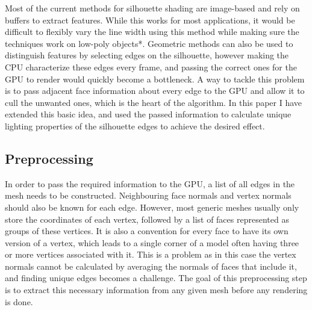 \documentclass[a4paper, 12pt]{article}
\begin{document}
Most of the current methods for silhouette shading are image-based and rely on buffers to extract features. While this works for most applications, it would be difficult to flexibly vary the line width using this method while making sure the techniques work on low-poly objects*. Geometric methods can also be used to distinguish features by selecting edges on the silhouette, however making the CPU characterize these edges every frame, and passing the correct ones for the GPU to render would quickly become a bottleneck. A way to tackle this problem is to pass adjacent face information about every edge to the GPU and allow it to cull the unwanted ones, which is the heart of the algorithm. In this paper I have extended this basic idea, and used the passed information to calculate unique lighting properties of the silhouette edges to achieve the desired effect.



\subsection{Preprocessing}

In order to pass the required information to the GPU, a list of all edges in the mesh needs to be constructed. Neighbouring face normals and vertex normals should also be known for each edge. However, most generic meshes usually only store the coordinates of each vertex, followed by a list of faces represented as groups of these vertices. It is also a convention for every face to have its own version of a vertex, which leads to a single corner of a model often having three or more vertices associated with it. This is a problem as in this case the vertex normals cannot be calculated by averaging the normals of faces that include it, and finding unique edges becomes a challenge. The goal of this preprocessing step is to extract this necessary information from any given mesh before any rendering is done.
\end{document}
